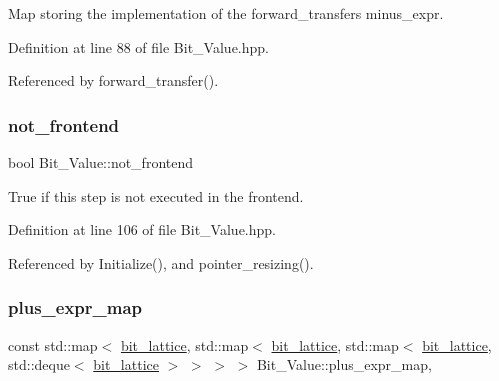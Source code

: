 Map storing the implementation of the forward\+\_\+transfer\textquotesingle{}s minus\+\_\+expr. 



Definition at line 88 of file Bit\+\_\+\+Value.\+hpp.



Referenced by forward\+\_\+transfer().

\mbox{\label{classBit__Value_ad7a83cc547266256277faf96c9774c4f}} 
\subsubsection{\texorpdfstring{not\+\_\+frontend}{not\_frontend}}
{\footnotesize\ttfamily bool Bit\+\_\+\+Value\+::not\+\_\+frontend\hspace{0.3cm}{\ttfamily [private]}}



True if this step is not executed in the frontend. 



Definition at line 106 of file Bit\+\_\+\+Value.\+hpp.



Referenced by Initialize(), and pointer\+\_\+resizing().

\mbox{\label{classBit__Value_a60afcc57dc9bc4992577b81eb752c396}} 
\subsubsection{\texorpdfstring{plus\+\_\+expr\+\_\+map}{plus\_expr\_map}}
{\footnotesize\ttfamily const std\+::map$<$ \hyperlink{bit__lattice_8hpp_ab732360111c810c4eaeb4c8b81d160d6}{bit\+\_\+lattice}, std\+::map$<$ \hyperlink{bit__lattice_8hpp_ab732360111c810c4eaeb4c8b81d160d6}{bit\+\_\+lattice}, std\+::map$<$ \hyperlink{bit__lattice_8hpp_ab732360111c810c4eaeb4c8b81d160d6}{bit\+\_\+lattice}, std\+::deque$<$ \hyperlink{bit__lattice_8hpp_ab732360111c810c4eaeb4c8b81d160d6}{bit\+\_\+lattice} $>$ $>$ $>$ $>$ Bit\+\_\+\+Value\+::plus\+\_\+expr\+\_\+map\hspace{0.3cm}{\ttfamily [static]}, {\ttfamily [private]}}



